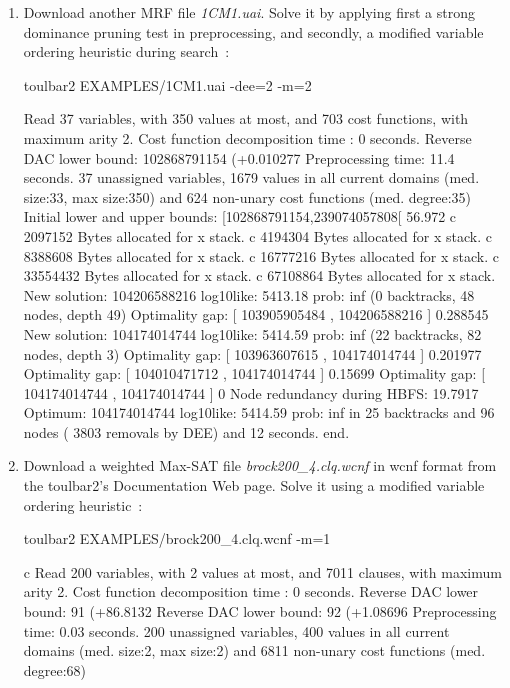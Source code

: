 \begin{enumerate}
\item Download another MRF file {\em 1CM1.uai}. Solve it by applying first a strong dominance pruning test in preprocessing, and secondly, a modified variable ordering heuristic during search~\cite{Schiex14a}:
\begin{DoxyCode}
	toulbar2 EXAMPLES/1CM1.uai -dee=2 -m=2
\end{DoxyCode}
{\scriptsize
\begin{DoxyCode}
Read 37 variables, with 350 values at most, and 703 cost functions, with maximum arity 2.
Cost function decomposition time : 0 seconds.
Reverse DAC lower bound: 102868791154 (+0.010277%
Preprocessing time: 11.4 seconds.
37 unassigned variables, 1679 values in all current domains (med. size:33, max size:350) and 624 non-unary cost functions (med. degree:35)
Initial lower and upper bounds: [102868791154,239074057808[ 56.972%
c 2097152 Bytes allocated for x stack.
c 4194304 Bytes allocated for x stack.
c 8388608 Bytes allocated for x stack.
c 16777216 Bytes allocated for x stack.
c 33554432 Bytes allocated for x stack.
c 67108864 Bytes allocated for x stack.
New solution: 104206588216 log10like: 5413.18 prob: inf (0 backtracks, 48 nodes, depth 49)
Optimality gap: [ 103905905484 , 104206588216 ] 0.288545 %
New solution: 104174014744 log10like: 5414.59 prob: inf (22 backtracks, 82 nodes, depth 3)
Optimality gap: [ 103963607615 , 104174014744 ] 0.201977 %
Optimality gap: [ 104010471712 , 104174014744 ] 0.15699 %
Optimality gap: [ 104174014744 , 104174014744 ] 0 %
Node redundancy during HBFS: 19.7917 %
Optimum: 104174014744 log10like: 5414.59 prob: inf in 25 backtracks and 96 nodes ( 3803 removals by DEE) and 12 seconds.
end.
\end{DoxyCode}}
\item Download a weighted Max-SAT file {\em brock200\_4.clq.wcnf} in wcnf format from the toulbar2's Documentation Web page. Solve it using a modified variable ordering heuristic~\cite{Schiex14a}:
\begin{DoxyCode}
	toulbar2 EXAMPLES/brock200_4.clq.wcnf -m=1
\end{DoxyCode}
{\scriptsize
\begin{DoxyCode}
c Read 200 variables, with 2 values at most, and 7011 clauses, with maximum arity 2.
Cost function decomposition time : 0 seconds.
Reverse DAC lower bound: 91 (+86.8132%
Reverse DAC lower bound: 92 (+1.08696%
Preprocessing time: 0.03 seconds.
200 unassigned variables, 400 values in all current domains (med. size:2, max size:2) and 6811 non-unary cost functions (med. degree:68)

\end{DoxyCode}}
\end{enumerate}

